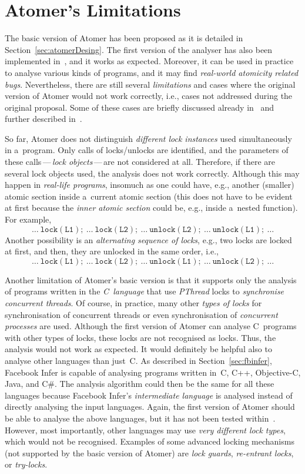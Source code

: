 \section{Atomer's Limitations}
\label{sec:atomerLimits}

The basic version of Atomer has been proposed as it is detailed in Section~\ref{sec:atomerDesing}. The first version of the analyser has also been implemented in~\cite{harmimBP}, and it works as expected. Moreover, it can be used in practice to analyse various kinds of programs, and it may find \emph{real-world atomicity related bugs}. Nevertheless, there are still several \emph{limitations} and cases where the original version of Atomer would not work correctly, i.e., cases not addressed during the original proposal. Some of these cases are briefly discussed already in~\cite{harmimBP} and further described in~\cite{excel2021Harmim}.

So far, Atomer does not distinguish \emph{different lock instances} used simultaneously in a~program. Only calls of locks/unlocks are identified, and the parameters of these calls\,---\,\emph{lock objects}\,---\,are not considered at all. Therefore, if there are several lock objects used, the analysis does not work correctly. Although this may happen in \emph{real-life programs}, insomuch as one could have, e.g., another (smaller) atomic section inside a~current atomic section (this does not have to be evident at first because the \emph{inner atomic section} could be, e.g., inside a~nested function). For example,
$$
    \mathtt{\ldots\ lock(L1);\ \ldots\ lock(L2);\ \ldots\ unlock(L2);\ \ldots\ unlock(L1);\ \ldots}
$$
Another possibility is an \emph{alternating sequence of locks}, e.g., two locks are locked at first, and then, they are unlocked in the same order, i.e.,
$$
    \mathtt{\ldots\ lock(L1);\ \ldots\ lock(L2);\ \ldots\ unlock(L1);\ \ldots\ unlock(L2);\ \ldots}
$$

Another limitation of Atomer's basic version is that it supports only the analysis of programs written in the \emph{C~language} that use \emph{PThread} locks to \emph{synchronise concurrent threads}. Of course, in practice, many other \emph{types of locks} for synchronisation of concurrent threads or even synchronisation of \emph{concurrent processes} are used. Although the first version of Atomer can analyse C~programs with other types of locks, these locks are not recognised as locks. Thus, the analysis would not work as expected. It would definitely be helpful also to analyse other languages than just~C. As described in Section~\ref{sec:fbinfer}, Facebook Infer is capable of analysing programs written in~C, C++, Objective-C, Java, and C\#. The analysis algorithm could then be the same for all these languages because Facebook Infer's \emph{intermediate language} is analysed instead of directly analysing the input languages. Again, the first version of Atomer should be able to analyse the above languages, but it has not been tested within~\cite{harmimBP}. However, most importantly, other languages may use \emph{very different lock types}, which would not be recognised. Examples of some advanced locking mechanisms (not supported by the basic version of Atomer) are \emph{lock guards}, \emph{re-entrant locks}, or \emph{try-locks}.

